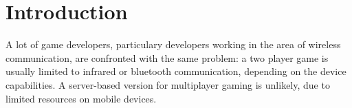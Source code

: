 

\pagestyle{empty}
\sloppy


\begin{abstract}

	SimME is a multiplayer game for mobile devices (mobile phones, PDAs, ...)
	developed to provide a basis for a gaming forum in which new games can
	easily be integrated. The architecture described in this document is
	targeted on assisting the implementation of multiplayer games for mobile
	devices.

\end{abstract}


\section{Introduction}

	A lot of game developers, particulary developers working in the area of
	wireless communication, are confronted with the same problem: a two player
	game is usually limited to infrared or bluetooth communication, depending on
	the device capabilities. A server-based version for multiplayer gaming is
	unlikely, due to limited resources on mobile devices.

